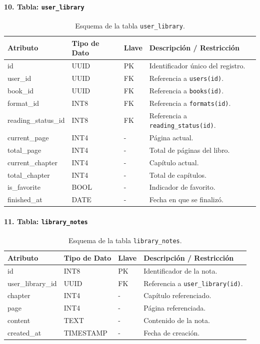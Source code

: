 \documentclass[12pt, atypical, journal]{article}
\begin{document}
\paragraph{10. Tabla: \texttt{user\_library}}
\begin{table}[H]
	\centering
	\begin{tabular}{|l|l|l|p{6.5cm}|}
		\hline
		\textbf{Atributo} & \textbf{Tipo de Dato} & \textbf{Llave} & \textbf{Descripción / Restricción} \\ \hline
		id & UUID & PK & Identificador único del registro. \\ \hline
		user\_id & UUID & FK & Referencia a \texttt{users(id)}. \\ \hline
		book\_id & UUID & FK & Referencia a \texttt{books(id)}. \\ \hline
		format\_id & INT8 & FK & Referencia a \texttt{formats(id)}. \\ \hline
		reading\_status\_id & INT8 & FK & Referencia a \texttt{reading\_status(id)}. \\ \hline
		current\_page & INT4 & - & Página actual. \\ \hline
		total\_page & INT4 & - & Total de páginas del libro. \\ \hline
		current\_chapter & INT4 & - & Capítulo actual. \\ \hline
		total\_chapter & INT4 & - & Total de capítulos. \\ \hline
		is\_favorite & BOOL & - & Indicador de favorito. \\ \hline
		finished\_at & DATE & - & Fecha en que se finalizó. \\ \hline
	\end{tabular}
	\caption{Esquema de la tabla \texttt{user\_library}.}
\end{table}

\paragraph{11. Tabla: \texttt{library\_notes}}
\begin{table}[H]
	\centering
	\begin{tabular}{|l|l|l|p{6.5cm}|}
		\hline
		\textbf{Atributo} & \textbf{Tipo de Dato} & \textbf{Llave} & \textbf{Descripción / Restricción} \\ \hline
		id & INT8 & PK & Identificador de la nota. \\ \hline
		user\_library\_id & UUID & FK & Referencia a \texttt{user\_library(id)}. \\ \hline
		chapter & INT4 & - & Capítulo referenciado. \\ \hline
		page & INT4 & - & Página referenciada. \\ \hline
		content & TEXT & - & Contenido de la nota. \\ \hline
		created\_at & TIMESTAMP & - & Fecha de creación. \\ \hline
	\end{tabular}
	\caption{Esquema de la tabla \texttt{library\_notes}.}
\end{table}
\end{document}
